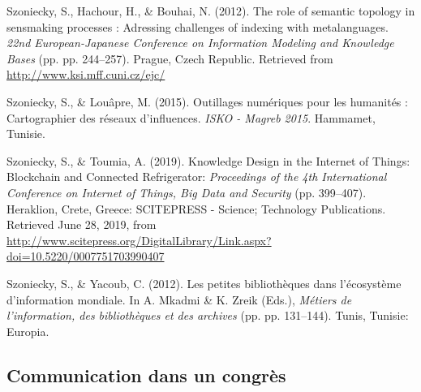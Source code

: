 \documentclass[
  a4paper,
  DIV=11,
  numbers=noendperiod]{scrreprt}
\newlength{\cslhangindent}
\newenvironment{CSLReferences}[2] %
 {\begin{list}{}{%
  \setlength{\itemindent}{0pt}
  \setlength{\leftmargin}{0pt}
  \setlength{\parsep}{0pt}
  \ifodd #1
   \setlength{\leftmargin}{\cslhangindent}
   \setlength{\itemindent}{-1\cslhangindent}
  \fi
  \setlength{\itemsep}{#2\baselineskip}}}
 {\end{list}}
\begin{document}
\begin{CSLReferences}{1}{0}
Szoniecky, S., Hachour, H., \& Bouhai, N. (2012). The role of semantic
topology in sensmaking processes : Adressing challenges of indexing with
metalanguages. \emph{22nd {European}-{Japanese} {Conference} on
{Information} {Modeling} and {Knowledge} {Bases}} (pp. pp. 244--257).
Prague, Czech Republic. Retrieved from
\url{http://www.ksi.mff.cuni.cz/ejc/}

Szoniecky, S., \& Louâpre, M. (2015). Outillages numériques pour les
humanités : Cartographier des réseaux d'influences. \emph{{ISKO} -
{Magreb} 2015}. Hammamet, Tunisie.

Szoniecky, S., \& Toumia, A. (2019). Knowledge {Design} in the
{Internet} of {Things}: {Blockchain} and {Connected} {Refrigerator}:
\emph{Proceedings of the 4th {International} {Conference} on {Internet}
of {Things}, {Big} {Data} and {Security}} (pp. 399--407). Heraklion,
Crete, Greece: SCITEPRESS - Science; Technology Publications. Retrieved
June 28, 2019, from
\url{http://www.scitepress.org/DigitalLibrary/Link.aspx?doi=10.5220/0007751703990407}

Szoniecky, S., \& Yacoub, C. (2012). Les petites bibliothèques dans
l'écosystème d'information mondiale. In A. Mkadmi \& K. Zreik (Eds.),
\emph{Métiers de l'information, des bibliothèques et des archives} (pp.
pp. 131--144). Tunis, Tunisie: Europia.

\end{CSLReferences}

\subsection{Communication dans un congrès}\label{sec-item299380}
\end{document}
